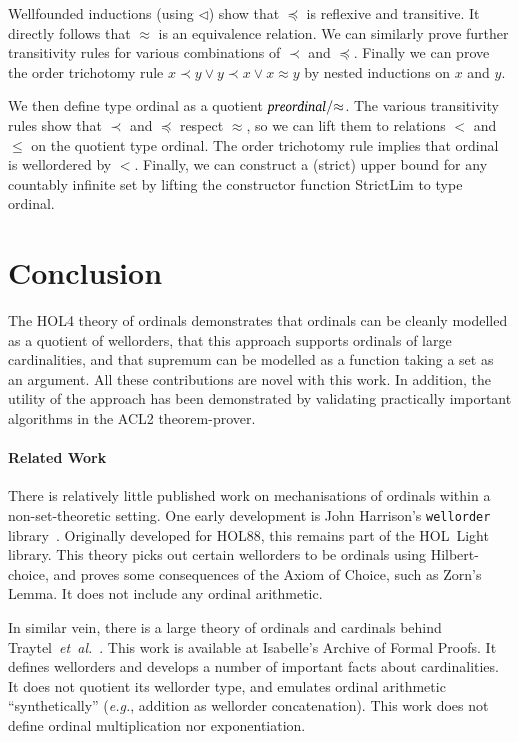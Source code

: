 \documentclass[11pt]{llncs}
\renewcommand{\HOLConst}[1]{{\textsf{\upshape\small #1}}}
\renewcommand{\HOLTyOp}[1]{\mbox{\fontencoding{T1}\fontfamily{bch}\fontseries{m}\fontshape{it}\fontsize{9.5}{10}\selectfont #1}}
\begin{document}
Wellfounded inductions (using $\lhd$) show that $\preceq$ is reflexive and transitive.
It directly follows that $\approx$ is an equivalence relation. We can similarly prove further transitivity rules for various combinations of $\prec$ and $\preceq$.
Finally we can prove the order trichotomy rule $x \prec y \lor y \prec x \lor x \approx y$ by nested inductions on $x$ and $y$.

We then define type \HOLTyOp{ordinal} as a quotient $\HOLTyOp{preordinal} / \mathord{\approx}$.
The various transitivity rules show that $\prec$ and $\preceq$ respect $\approx$, so we can lift them to relations $<$ and $\le$ on the quotient type \HOLTyOp{ordinal}.
The order trichotomy rule implies that \HOLTyOp{ordinal} is wellordered by $<$.
Finally, we can construct a (strict) upper bound for any countably infinite set by lifting the constructor function \HOLConst{StrictLim} to type \HOLTyOp{ordinal}.



\section{Conclusion}

The HOL4 theory of ordinals demonstrates that ordinals can be cleanly modelled as a quotient of wellorders, that this approach supports ordinals of large cardinalities, and that supremum can be modelled as a function taking a set as an argument.
All these contributions are novel with this work.
In addition, the utility of the approach has been demonstrated by validating practically important algorithms in the ACL2 theorem-prover.

\paragraph{Related Work}
There is relatively little published work on mechanisations of ordinals within a non-set-theoretic setting.
One early development is John Harrison's \texttt{wellorder} library~\cite{harrison92:_hol_wellorder}.
Originally developed for HOL88, this remains part of the HOL~Light library.
This theory picks out certain wellorders to be ordinals using Hilbert-choice, and proves some consequences of the Axiom of Choice, such as Zorn's Lemma.
It does not include any ordinal arithmetic.

In similar vein, there is a large theory of ordinals and cardinals behind Traytel~\emph{et~al.}~\cite{LICS2012:Traytel:datatypes}.
This work is available at Isabelle's Archive of Formal Proofs.
It defines wellorders and develops a number of important facts about cardinalities.
It does not quotient its wellorder type, and emulates ordinal arithmetic ``synthetically'' (\emph{e.g.}, addition as wellorder concatenation).
This work does not define ordinal multiplication nor exponentiation.
\end{document}
